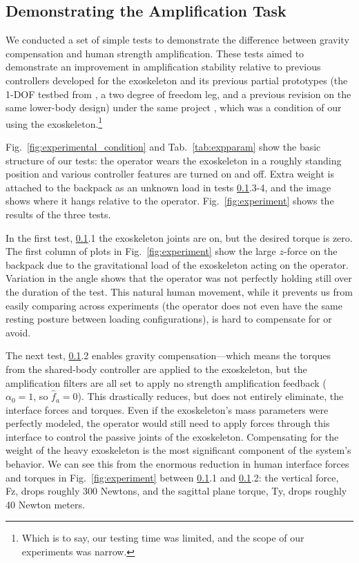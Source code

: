 \documentclass[utf8]{frontiersSCNS}
\renewcommand*{\cite}[1]{\citep{#1}}
\begin{document}
\subsection{Demonstrating the Amplification Task}\label{subs:amp}
We conducted a set of simple tests to demonstrate the difference between gravity compensation and human strength amplification. These tests aimed to demonstrate an improvement in amplification stability relative to previous controllers developed for the exoskeleton and its previous partial prototypes (the 1-DOF testbed from \cite{HeThomasPaineSentis2019ACC,ThomasCoholichSentis2019AIM}, a two degree of freedom leg, and a previous revision on the same lower-body design) under the same project \cite{Campbell2018Thesis}, which was a condition of our using the exoskeleton.\footnote{Which is to say, our testing time was limited, and the scope of our experiments was narrow.} 

Fig.~\ref{fig:experimental_condition} and Tab.~\ref{tab:expparam} show the basic structure of our tests: the operator wears the exoskeleton in a roughly standing position and various controller features are turned on and off. Extra weight is attached to the backpack as an unknown load in tests \ref{subs:amp}.3-4, and the image shows where it hangs relative to the operator. Fig.~\ref{fig:experiment} shows the results of the three tests. 

 

In the first test, \ref{subs:amp}.1 the exoskeleton joints are on, but the desired torque is zero. The first column of plots in Fig.~\ref{fig:experiment} show the large $z$-force on the backpack due to the gravitational load of the exoskeleton acting on the operator. Variation in the angle shows that the operator was not perfectly holding still over the duration of the test.
This natural human movement, while it prevents us from easily comparing across experiments (the operator does not even have the same resting posture between loading configurations), is hard to compensate for or avoid.

The next test, \ref{subs:amp}.2 enables gravity compensation---which means the torques from the shared-body controller are applied to the exoskeleton, but the amplification filters are all set to apply no strength amplification feedback ($\alpha_0=1$, so $\widehat f_a=0$). This drastically reduces, but does not entirely eliminate, the interface forces and torques. Even if the exoskeleton's mass parameters were perfectly modeled, the operator would still need to apply forces through this interface to control the passive joints of the exoskeleton. Compensating for the weight of the heavy exoskeleton is the most significant component of the system's behavior. We can see this from the enormous reduction in human interface forces and torques in Fig.~\ref{fig:experiment} between \ref{subs:amp}.1 and \ref{subs:amp}.2: the vertical force, Fz, drops roughly 300 Newtons, and the sagittal plane torque, Ty, drops roughly 40 Newton meters.
\end{document}
